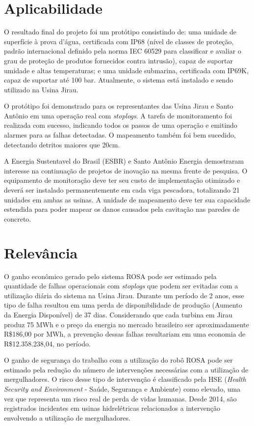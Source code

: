 \section{Aplicabilidade}

O resultado final do projeto foi um protótipo consistindo de: uma unidade de
superfície à prova d'água, certificada com IP68 (nível de classes de proteção,
padrão internacional definido pela norma IEC 60529 para classificar e avaliar
o grau de proteção de produtos fornecidos contra intrusão), capaz de suportar
umidade e altas temperaturas; e uma unidade submarina, certificada com IP69K,
capaz de suportar até 100 bar. Atualmente, o sistema está instalado e sendo
utilizado na Usina Jirau.

O protótipo foi demonstrado para os representantes das Usina Jirau e Santo
Antônio em uma operação real com \textit{stoplogs}. A tarefa de monitoramento
foi realizada com sucesso, indicando todos os passos de uma operação e emitindo
alarmes para as falhas detectadas. O mapeamento também foi bem sucedido,
detectando detritos maiores que 20cm. 

A Energia Sustentavel do Brasil (ESBR) e Santo Antônio Energia demostraram
interesse na continuação de projetos de inovação na mesma frente de pesquisa. O
equipamento de monitoração deve ter seu custo de implementação otimizado e
deverá ser instalado permanentemente em cada viga pescadora, totalizando 21
unidades em ambas as usinas. A unidade de mapeamento deve ter
sua capacidade estendida para poder mapear os danos causados pela cavitação nas
paredes de concreto.

\section{Relevância}

O ganho econômico gerado pelo sistema ROSA pode ser estimado pela quantidade de
falhas operacionais com \textit{stoplogs} que podem ser evitadas com a
utilização diária do sistema na Usina Jirau. Durante um período de 2 anos,
esse tipo de falha resultou em uma perda de disponibilidade de produção (Aumento
da Energia Disponível) de 37 dias. Considerando que cada turbina em Jirau produz
75 MWh e o preço da energia no mercado brasileiro ser aproximadamente R\$186,00
por MWh, a prevenção dessas falhas resultariam em uma economia de
R\$12.358.238,04, no período.

O ganho de segurança do trabalho com a utilização do robô ROSA pode ser estimado
pela redução do número de intervenções necessárias com a utilização de
mergulhadores. O risco desse tipo de intervenção é classificado pela HSE
(\textit{Health Security and Environment} - Saúde, Segurança e Ambiente) como
elevado, uma vez que representa um risco real de perda de vidas humanas. Desde
2014, são registrados incidentes em usinas hidrelétricas relacionados a
intervenção envolvendo a utilização de mergulhadores. 

